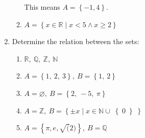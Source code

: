 \begin{enumerate}
\begin{enumerate}
{\begin{answer}
              This means $A=\left\{ -1, 4 \right\}$.
          \end{answer}}
        \fi
      \item $A=\left\{ x\in\mathbb{R}\mid x<5\wedge x \geq 2\right\}$
        \if\withsol1{

            \begin{answer}
              $x=\left[2,5\right)$
          \end{answer}}
        \fi
    \end{enumerate}

  \item Determine the relation between the sets:
    \begin{enumerate}
      \item $\mathbb{R},\ \mathbb{Q},\ \mathbb{Z},\ \mathbb{N}$
        \if{}
        \fi

      \item $A=\left\{ 1,\ 2,\ 3\right\},\ B=\left\{ 1,\ 2 \right\}$
        \if{}
        \fi


      \item $A=\varnothing,\ B=\left\{ 2,\ -5,\ \pi \right\}$
        \if{}
        \fi

      \item $A=\mathbb{Z},\ B=\left\{ \pm x \mid x\in\mathbb{N} \cup \right\{0\left\} \right\}$
        \if{}
        \fi
      \item $A=\left\{\pi, e, \sqrt(2)\right\},\ B=\mathbb{Q}$
        \if{}
        \fi
    \end{enumerate}


\end{enumerate}
